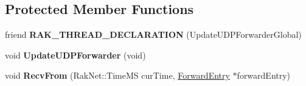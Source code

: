 \subsection*{Protected Member Functions}
\begin{DoxyCompactItemize}
\item 
\hypertarget{class_rak_net_1_1_u_d_p_forwarder_ac11e003ef785bcf7da081978890c7db8}{friend {\bfseries R\-A\-K\-\_\-\-T\-H\-R\-E\-A\-D\-\_\-\-D\-E\-C\-L\-A\-R\-A\-T\-I\-O\-N} (Update\-U\-D\-P\-Forwarder\-Global)}\label{class_rak_net_1_1_u_d_p_forwarder_ac11e003ef785bcf7da081978890c7db8}

\item 
\hypertarget{class_rak_net_1_1_u_d_p_forwarder_a5d29bfb5cd31b6beda6e67030728a0d9}{void {\bfseries Update\-U\-D\-P\-Forwarder} (void)}\label{class_rak_net_1_1_u_d_p_forwarder_a5d29bfb5cd31b6beda6e67030728a0d9}

\item 
\hypertarget{class_rak_net_1_1_u_d_p_forwarder_a5e6b49b93db4b437fcee5dec6a74379b}{void {\bfseries Recv\-From} (Rak\-Net\-::\-Time\-M\-S cur\-Time, \hyperlink{struct_rak_net_1_1_u_d_p_forwarder_1_1_forward_entry}{Forward\-Entry} $\ast$forward\-Entry)}\label{class_rak_net_1_1_u_d_p_forwarder_a5e6b49b93db4b437fcee5dec6a74379b}

\end{DoxyCompactItemize}
